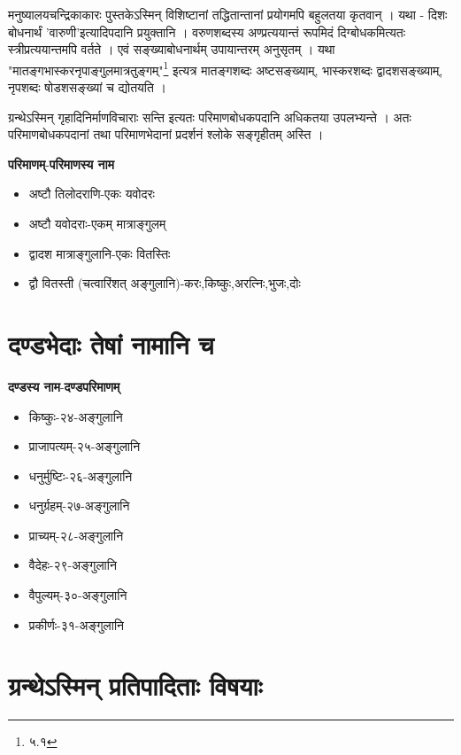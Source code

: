 मनुष्यालयचन्द्रिकाकारः पुस्तकेऽस्मिन् विशिष्टानां तद्धितान्तानां प्रयोगमपि बहुलतया कृतवान् । यथा - दिशः बोधनार्थं 'वारुणी'इत्यादिपदानि प्रयुक्तानि । वरुणशब्दस्य अण्प्रत्ययान्तं रूपमिदं दिग्बोधकमित्यतः स्त्रीप्रत्ययान्तमपि वर्तते । एवं सङ्ख्याबोधनार्थम् उपायान्तरम् अनुसृतम् । यथा "मातङ्गभास्करनृपाङ्गुलमात्रतुङ्गम्"\footnote{५.१} इत्यत्र मातङ्गशब्दः  अष्टसङ्ख्याम्, भास्करशब्दः द्वादशसङ्ख्याम्, नृपशब्दः षोडशसङ्ख्यां च द्योतयति ।

ग्रन्थेऽस्मिन् गृहादिनिर्माणविचाराः सन्ति इत्यतः परिमाणबोधकपदानि अधिकतया उपलभ्यन्ते । अतः परिमाणबोधकपदानां तथा परिमाणभेदानां प्रदर्शनं  श्लोके सङ्गृहीतम् अस्ति । 

{\b\bfseries परिमाणम्}\hfil -\hfil {\b\bfseries परिमाणस्य नाम}
\begin{itemize}
\item अष्टौ तिलोदराणि\hfil -\hfil एकः यवोदरः
\item अष्टौ यवोदराः\hfil -\hfil एकम् मात्राङ्गुलम्
\item द्वादश मात्राङ्गुलानि\hfil -\hfil एकः वितस्तिः
\item द्वौ वितस्ती (चत्वारिंशत् अङ्गुलानि)\hfil -\hfil करः,किष्कुः,अरत्निः,भुजः,दोः
\end{itemize}

\section{दण्डभेदाः तेषां नामानि च}

{\b\bfseries दण्डस्य नाम}\hfil -\hfil {\b\bfseries दण्डपरिमाणम्}
\begin{itemize}
\item किष्कुः\hfil -\hfil २४-अङ्गुलानि
\item प्राजापत्यम्\hfil -\hfil २५-अङ्गुलानि
\item धनुर्मुष्टिः\hfil -\hfil २६-अङ्गुलानि
\item धनुर्ग्रहम्\hfil -\hfil २७-अङ्गुलानि
\item प्राच्यम्\hfil -\hfil २८-अङ्गुलानि
\item वैदेहः\hfil -\hfil २९-अङ्गुलानि
\item वैपुल्यम्\hfil -\hfil ३०-अङ्गुलानि
\item प्रकीर्णः\hfil -\hfil ३१-अङ्गुलानि
\end{itemize}

\section{ग्रन्थेऽस्मिन् प्रतिपादिताः विषयाः}

